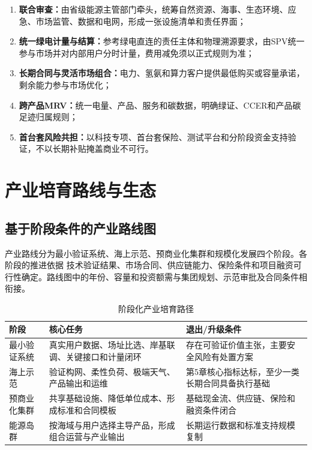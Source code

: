 \begin{enumerate}
  \item \textbf{联合审查：}由省级能源主管部门牵头，统筹自然资源、海事、生态环境、应急、市场监管、数据和电网，形成一张设施清单和责任界面；
  \item \textbf{统一绿电计量与结算：}参考绿电直连的责任主体和物理溯源要求，由SPV统一参与市场并对内部用户分时计量，费用减免须以正式规则为准；
  \item \textbf{长期合同与灵活市场组合：}电力、氢氨和算力客户提供最低购买或容量承诺，剩余能力参与市场优化；
  \item \textbf{跨产品MRV：}统一电量、产品、服务和碳数据，明确绿证、CCER和产品碳足迹归属规则；
  \item \textbf{首台套风险共担：}以科技专项、首台套保险、测试平台和分阶段资金支持验证，不以长期补贴掩盖商业不可行。
\end{enumerate}

\section{产业培育路线与生态}

\subsection{基于阶段条件的产业路线图}

产业路线分为最小验证系统、海上示范、预商业化集群和规模化发展四个阶段。各阶段的推进依据
技术验证结果、市场合同、供应链能力、保险条件和项目融资可行性确定。路线图中的年份、容量和投资额需与集团规划、示范审批及合同条件相衔接。

\begin{table}[H]
\centering
\caption{阶段化产业培育路径}
\label{tab:c6-roadmap}
\begin{tabularx}{\textwidth}{p{2.4cm} X X}
\toprule
阶段 & 核心任务 & 退出/升级条件\\
\midrule
最小验证系统 & 真实用户数据、场址比选、岸基联调、关键接口和计量闭环 & 存在可验证价值主张，主要安全风险有处置方案\\
海上示范 & 验证构网、柔性负荷、极端天气、产品输出和运维 & 第5章核心指标达标，至少一类长期合同具备执行基础\\
预商业化集群 & 共享基础设施、降低单位成本、形成标准和合同模板 & 基础现金流、供应链、保险和融资条件闭合\\
能源岛群 & 按海域与用户选择主导产品，形成组合运营与产业输出 & 长期运行数据和标准支持规模复制\\
\bottomrule
\end{tabularx}
\end{table}

